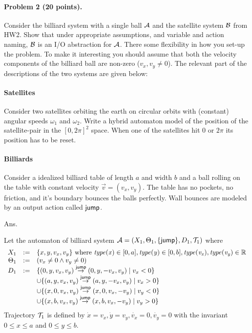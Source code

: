 \documentclass[11pt]{article}
\begin{document}
 \paragraph{Problem 2 (20 points).} 
 Consider the billiard system with a single ball ${\cal A}$ and the satellite system ${\cal B}$ from HW2. Show that under appropriate assumptions, and variable and action naming, ${\cal B}$ is an I/O abstraction for ${\cal A}$. There some flexibility in how you set-up the problem. To make it interesting you should assume that both the velocity components of the billiard ball are non-zero ($v_x, v_y \neq 0$). The relevant part of the descriptions of the two systems are given below:
 
 \paragraph{Satellites}
 Consider two satellites orbiting the earth on circular orbits with (constant) angular speeds $\omega_1$ and $\omega_2$.  Write a hybrid automaton model of the position of the satellite-pair in the $[0,2\pi]^2$ space. When one of the satellites hit $0$ or $2\pi$ its position has to be reset.
 
 \paragraph{Billiards}
 Consider a idealized billiard table of length $a$ and width $b$ and a ball rolling on the table with constant velocity $\vec{v} = (v_x, v_y)$. The table has no pockets, no friction, and it's boundary bounces the balls perfectly. Wall bounces are modeled by an output action called ${\operatorname{\mathsf{jump}}}$. 
 
 Ans.
 
Let the automaton of billiard system ${\cal A} = (X_1, \Theta_1, \{{\operatorname{\mathsf{jump}}}\}, D_1, {\cal T}_1)$ where
\[
\begin{array}{rcl}
	     X_1 & := & \{x, y, v_x, v_y\} \text{ where } \type{x} \in [0, a], \type{y} \in [0, b], \type{v_x}, \type{v_y} \in \reals \\
	\Theta_1 & := & (v_x \neq 0 \land v_y \neq 0)                                                                                 \\
	     D_1 & := & \{(0, y, v_x, v_y) \arrow{\act{jump}} (0, y, -v_x, v_y) \mid v_x < 0\}                               \\
&& \cup         \{(a, y, v_x, v_y) \arrow{\act{jump}} (a, y, -v_x, v_y) \mid v_x > 0\}                               \\
	         &    & \cup \{(x, 0, v_x, v_y) \arrow{\act{jump}} (x, 0, v_x, -v_y) \mid v_y < 0\}                          \\
 	         &    & \cup \{(x, b, v_x, v_y) \arrow{\act{jump}} (x, b, v_x, -v_y) \mid v_y > 0\}                          \\
\end{array}
\]
Trajectory ${\cal T}_1$ is defined by $\dot{x} = v_x, \dot{y} = v_y, \dot{v_x} = 0, \dot{v_y} = 0$ with the invariant $0 \leq x \leq a$ and $0 \leq y \leq b$.
\end{document}
